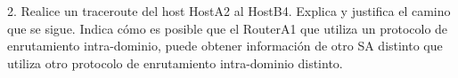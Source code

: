 \begin{ejer}
2. Realice un traceroute del host HostA2 al HostB4. Explica y justifica el camino que se sigue. Indica cómo es posible que el RouterA1 que utiliza un protocolo de enrutamiento intra-dominio, puede obtener información de otro SA distinto que utiliza otro protocolo de enrutamiento intra-dominio distinto.
\end{ejer}